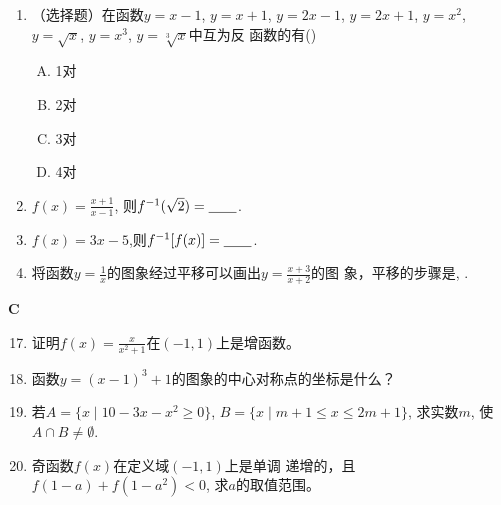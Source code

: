 \begin{enumerate}
\item （选择题）在函数$y= x- 1$, $y= x+ 1$,  $y= 2x- 1$, $y=2x+1$, $y=x^{2}$, $y=\sqrt{x}$, $y=x^{3}$, $y=\sqrt[{3}]{x}$中互为反
函数的有(\quad)
\begin{multicols}{4}
    \begin{enumerate}[(A)]
        \item 1对
        \item 2对
        \item 3对
        \item 4对
    \end{enumerate}
    \end{multicols}

\item $f(x)=\frac{x+1}{x-1}$, 则$f^{-1}(\sqrt{2})=\underline{\qquad}$.

\item $f(x)=3x-5$,则$f^{-1}[f(x)]=\underline{\qquad}$.

\item 将函数$y=\frac{1}{x}$的图象经过平移可以画出$y=\frac{x+3}{x+2}$的图
象，平移的步骤是\blank, \blank.
\end{enumerate}

\begin{center}
    \bfseries C
\end{center}

\begin{enumerate}\setcounter{enumi}{16}
\item 证明$f(x)=\frac x{x^2+1}$在$(-1,1)$上是增函数。

\item  函数$y=(x-1)^3+1$的图象的中心对称点的坐标是什么？ 
\item 若$A=\{x\mid 10-3x-x^{2}\ge 0\}$, $B=\{x\mid m+1\leq x\leq 2m+1\}$, 
求实数$m$, 使$A\cap B\neq\emptyset$.
\item 奇函数$f(x)$在定义域$(-1,1)$上是单调 递增的，且
$f\left(1-a\right)+f\left(1-a^2\right)<0$, 求$a$的取值范围。
\end{enumerate}














